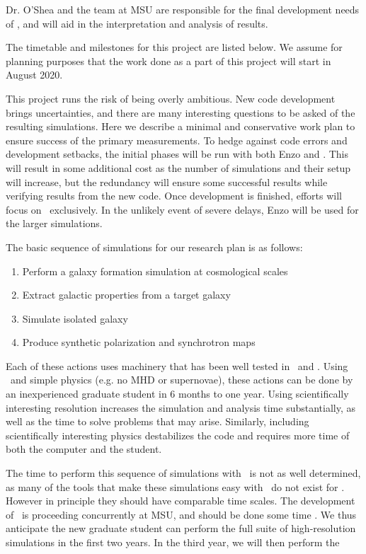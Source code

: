 Dr. O'Shea and the team at MSU are responsible for the final development needs
of \enzoe, and will aid in the interpretation and analysis of results.

The timetable and milestones for this project are listed below.  We
assume for planning purposes that the work done as a part of this
project will start in August 2020.

This project runs the risk of being overly ambitious.  New code development 
brings uncertainties, and there are many interesting questions to be asked of
the resulting simulations.  Here we describe a minimal and conservative work
plan to ensure success of the primary measurements.  To hedge against code
errors and development setbacks, the initial phases will be run with both Enzo
and \enzoe.  This will result in some additional cost as the number of
simulations and their setup will increase, but the redundancy will ensure some
successful results while verifying results from the new code.  Once development
is finished, efforts will focus on \enzoe\ exclusively.  In the unlikely event
of severe delays, Enzo will be used for the larger simulations. 

The basic sequence of simulations for our research plan is as follows:
\begin{enumerate}
    \item Perform a galaxy formation simulation at cosmological scales
    \item Extract galactic properties from a target galaxy
    \item Simulate isolated galaxy
    \item Produce synthetic polarization and synchrotron maps
\end{enumerate}
Each of these actions uses machinery that has been well tested in \enzo\ and
\yt.  
Using \enzo\ and simple physics (e.g. no MHD or supernovae), these actions can be done by an
inexperienced graduate student in 
6 months to one year.   Using scientifically interesting resolution increases
the simulation and analysis time substantially, as well as the time to solve problems that may
arise.  Similarly, including scientifically interesting physics destabilizes the code
and requires more time of both the computer and the student.  

The time to
perform this sequence of simulations with \enzoe\ is not as well determined, as
many of the tools that make these simulations easy with \enzo\ do not exist for
\enzoe.  However in principle they should have comparable time scales.
The development of \enzoe\ is proceeding concurrently at MSU, and
should be done some time . 
We thus anticipate the new graduate student can perform the full suite of
high-resolution simulations in the first two years.  In the third year, we will
then perform the 

